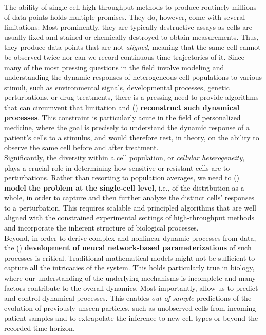 The ability of single-cell high-throughput methods to produce routinely millions of data points holds multiple promises. They do, however, come with several limitations: 
 Most prominently, they are typically destructive assays as cells are usually fixed and stained or chemically destroyed to obtain measurements. Thus, they produce data points that are not \textit{aligned}, meaning that the same cell cannot be observed twice nor can we record continuous time trajectories of it.
Since many of the most pressing questions in the field involve modeling and understanding the dynamic responses of heterogeneous cell populations to various stimuli, such as environmental signals, developmental processes, genetic perturbations, or drug treatments, there is a pressing need to provide algorithms that can circumvent that limitation and () \textbf{reconstruct such dynamical processes}. 
This constraint is particularly acute in the field of personalized medicine, where the goal is precisely to understand the dynamic response of a patient's cells to a stimulus, and would therefore rest, in theory, on the ability to observe the same cell before and after treatment. \\

Significantly, the diversity within a cell population, or \textit{cellular heterogeneity}, plays a crucial role in determining how sensitive or resistant cells are to perturbations.
Rather than resorting to population averages, we need to () \textbf{model the problem at the single-cell level}, i.e., of the distribution as a whole, in order to capture and then further analyze the distinct cells' responses to a perturbation. 
This requires scalable and principled algorithms that are well aligned with the constrained experimental settings of high-throughput methods and incorporate the inherent structure of biological processes. \\

Beyond, in order to derive complex and nonlinear dynamic processes from data, the () \textbf{development of neural network-based parameterizations} of such processes is critical.
Traditional mathematical models might not be sufficient to capture all the intricacies of the system. This holds particularly true  in biology, where our understanding of the underlying mechanisms is incomplete and many factors contribute to the overall dynamics.
Most importantly,  allow us to predict and control dynamical processes. This enables \emph{out-of-sample} predictions of the evolution of previously unseen particles, such as unobserved cells from incoming patient samples and to extrapolate the inference to new cell types or beyond the recorded time horizon. \\

